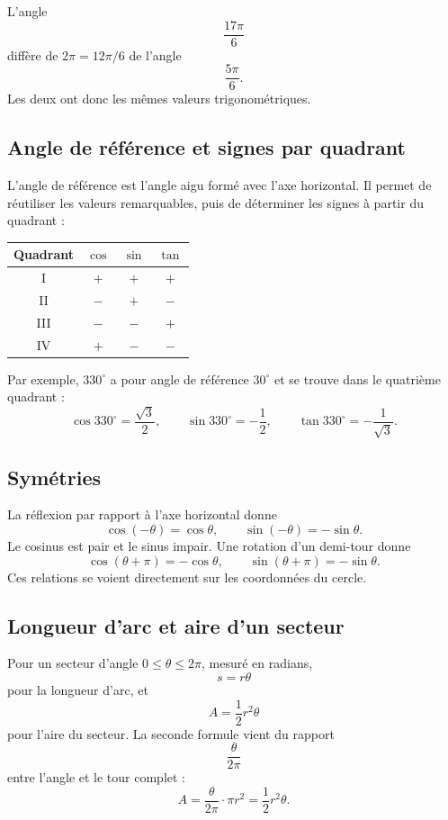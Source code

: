 \begin{examplebox}
L'angle
\[
\frac{17\pi}{6}
\]
diffère de $2\pi=12\pi/6$ de l'angle
\[
\frac{5\pi}{6}.
\]
Les deux ont donc les mêmes valeurs trigonométriques.
\end{examplebox}

\subsection{Angle de référence et signes par quadrant}

L'angle de référence est l'angle aigu formé avec l'axe horizontal. Il permet de réutiliser les valeurs remarquables, puis de déterminer les signes à partir du quadrant :
\begin{center}
\begin{tabular}{c|ccc}
\toprule
Quadrant & $\cos$ & $\sin$ & $\tan$\\\midrule
I & $+$ & $+$ & $+$\\
II & $-$ & $+$ & $-$\\
III & $-$ & $-$ & $+$\\
IV & $+$ & $-$ & $-$\\
\bottomrule
\end{tabular}
\end{center}

Par exemple, $330^\circ$ a pour angle de référence $30^\circ$ et se trouve dans le quatrième quadrant :
\[
\cos330^\circ=\frac{\sqrt3}{2},
\qquad
\sin330^\circ=-\frac12,
\qquad
\tan330^\circ=-\frac1{\sqrt3}.
\]

\subsection{Symétries}

La réflexion par rapport à l'axe horizontal donne
\[
\cos(-\theta)=\cos\theta,
\qquad
\sin(-\theta)=-\sin\theta.
\]
Le cosinus est pair et le sinus impair. Une rotation d'un demi-tour donne
\[
\cos(\theta+\pi)=-\cos\theta,
\qquad
\sin(\theta+\pi)=-\sin\theta.
\]
Ces relations se voient directement sur les coordonnées du cercle.

\subsection{Longueur d'arc et aire d'un secteur}

Pour un secteur d'angle $0\le\theta\le2\pi$, mesuré en radians,
\[
s=r\theta
\]
pour la longueur d'arc, et
\[
A=\frac12r^2\theta
\]
pour l'aire du secteur. La seconde formule vient du rapport
\[
\frac{\theta}{2\pi}
\]
entre l'angle et le tour complet :
\[
A=\frac{\theta}{2\pi}\cdot\pi r^2=\frac12r^2\theta.
\]

